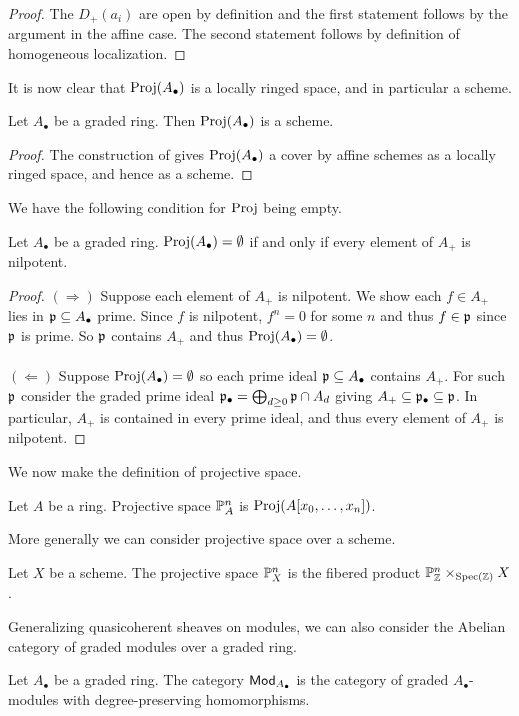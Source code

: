 \begin{proof}
    The $D_{+}(a_{i})$ are open by definition and the first statement follows by the argument in the affine case. The second statement follows by definition of homogeneous localization. 
\end{proof}
It is now clear that $\operatorname{Proj}(A_{\bullet})$ is a locally ringed space, and in particular a scheme. 
\begin{corollary}\label{corr: proj is a scheme}
    Let $A_{\bullet}$ be a graded ring. Then $\operatorname{Proj}(A_{\bullet})$ is a scheme. 
\end{corollary}
\begin{proof}
    The construction of  gives $\operatorname{Proj}(A_{\bullet})$ a cover by affine schemes as a locally ringed space, and hence as a scheme. 
\end{proof}
We have the following condition for $\operatorname{Proj}$ being empty. 
\begin{proposition}
    Let $A_{\bullet}$ be a graded ring. $\operatorname{Proj}(A_{\bullet})=\emptyset$ if and only if every element of $A_{+}$ is nilpotent. 
\end{proposition}
\begin{proof}
    $(\Longrightarrow)$ Suppose each element of $A_{+}$ is nilpotent. We show each $f\in A_{+}$ lies in $\mathfrak{p}\subseteq A_{\bullet}$ prime. Since $f$ is nilpotent, $f^{n}=0$ for some $n$ and thus $f\in \mathfrak{p}$ since $\mathfrak{p}$ is prime. So $\mathfrak{p}$ contains $A_{+}$ and thus $\operatorname{Proj}(A_{\bullet})=\emptyset$.
    \\\\
    $(\Longleftarrow)$ Suppose $\operatorname{Proj}(A_{\bullet})=\emptyset$ so each prime ideal $\mathfrak{p}\subseteq A_{\bullet}$ contains $A_{+}$. For such $\mathfrak{p}$ consider the graded prime ideal $\mathfrak{p}_{\bullet}=\bigoplus_{d\geq0}\mathfrak{p}\cap A_{d}$ giving $A_{+}\subseteq\mathfrak{p}_{\bullet}\subseteq\mathfrak{p}$. In particular, $A_{+}$ is contained in every prime ideal, and thus every element of $A_{+}$ is nilpotent. 
\end{proof}
We now make the definition of projective space. 
\begin{definition}\label{def: projective space}
    Let $A$ be a ring. Projective space $\mathbb{P}^{n}_{A}$ is $\operatorname{Proj}(A[x_{0},\dots,x_{n}])$. 
\end{definition}
More generally we can consider projective space over a scheme. 
\begin{definition}\label{def: projective space over scheme}
    Let $X$ be a scheme. The projective space $\mathbb{P}^{n}_{X}$ is the fibered product $\mathbb{P}^{n}_{\mathbb{Z}}\times_{\operatorname{Spec}(\mathbb{Z})}X$. 
\end{definition}
Generalizing quasicoherent sheaves on modules, we can also consider the Abelian category of graded modules over a graded ring. 
\begin{definition}\label{def: graded modules}
    Let $A_{\bullet}$ be a graded ring. The category $\mathsf{Mod}_{A_{\bullet}}$ is the category of graded $A_{\bullet}$-modules with degree-preserving homomorphisms. 
\end{definition}